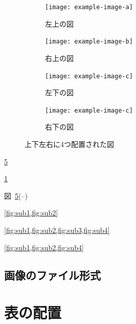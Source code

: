 \begin{figure}[tp]
    \centering
    \begin{subfigure}{0.45\textwidth}
        \centering
        \texttt{[image: example-image-a]}
        \caption{左上の図}
        \label{fig:sub1}
    \end{subfigure}
    \hfill %
    \begin{subfigure}{0.45\textwidth}
        \centering
        \texttt{[image: example-image-b]}
        \caption{右上の図}
        \label{fig:sub2}
    \end{subfigure}
    
    \vspace{5mm} %
    
    \begin{subfigure}[b]{0.45\textwidth}
        \centering
        \texttt{[image: example-image-c]}
        \caption{左下の図}
        \label{fig:sub3}
    \end{subfigure}
    \hfill %
    \begin{subfigure}[b]{0.45\textwidth}
        \centering
        \texttt{[image: example-image-c]}
        \caption{右下の図}
        \label{fig:sub4}
    \end{subfigure}
    \caption{上下左右に4つ配置された図}
    \label{fig:four_subfigures}
\end{figure}


\ref{fig:four_subfigures}

\ref{fig:sub1}

図~\ref{fig:four_subfigures}(--)


\cref{fig:sub1,fig:sub2}

\cref{fig:sub1,fig:sub2,fig:sub3,fig:sub4}

\cref{fig:sub1,fig:sub2,fig:sub4}


\subsection{画像のファイル形式}
\label{ssec:figure_format}



\section{表の配置}
\label{sec:table}






